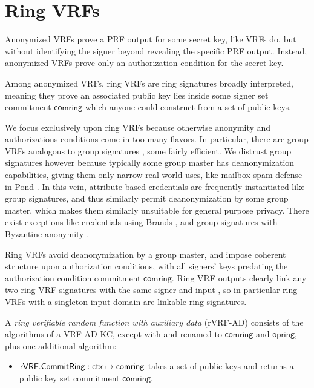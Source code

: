 
\section{Ring VRFs}
\label{sec:rvrf_def}

Anonymized VRFs prove a PRF output for some secret key, like VRFs do,
but without identifying the signer beyond revealing the specific PRF output.
Instead, anonymized VRFs prove only an authorization condition for
the secret key.

\def\comring{\ensuremath{\mathsf{comring}}\xspace}
\def\openring{\ensuremath{\mathsf{opring}}\xspace}
\newcommand{\CommitRing}{\primalgo{CommitRing}}
\newcommand{\OpenRing}{\primalgo{OpenRing}}

Among anonymized VRFs, ring VRFs are ring signatures broadly interpreted,
meaning they prove an associated public key lies inside some signer set
commitment \comring which anyone could construct from a set of public keys.

We focus exclusively upon ring VRFs because otherwise anonymity and
authorizations conditions come in too many flavors.
In particular, there are group VRFs analogous to group signatures
 \cite{group_sig_survey}, some fairly efficient.
%
We distrust group signatures however because typically some group master
has deanonymization capabilities, giving them only narrow real world uses,
like mailbox spam defense in Pond \cite{pond}.
%
In this vein, attribute based credentials are frequently instantiated
like group signatures, and thus similarly permit deanonymization by some
group master, which makes them similarly unsuitable for general purpose
privacy.
%
There exist exceptions like credentials using Brands \cite{brands06}, and
group signatures with Byzantine anonymity \cite{cryptoeprint:2021:181}.

Ring VRFs avoid deanonymization by a group master, and impose coherent
structure upon authorization conditions, with all signers' keys
predating the authorization condition commitment \comring. 
%
Ring VRF outputs clearly link any two ring VRF signatures with
the same signer and input \msg, so in particular
 ring VRFs with a singleton input domain are linkable ring signatures.

\smallskip

A {\em ring verifiable random function with auxiliary data} (rVRF-AD)
consists of the algorithms of a VRF-AD-KC, except with
 \compk and \openpk renamed to \comring and \openring,
 plus one additional algorithm:
\begin{itemize}
\item $\rVRF.\CommitRing : \ctx \mapsto \comring$ takes a set \ctx of
 public keys and returns a public key set commitment \comring.
\end{itemize}

